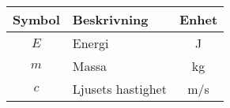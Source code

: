 \begin{raggedleft}
 \begin{tabular}{ c  l  c }
 \textbf{Symbol} & \textbf{Beskrivning} & \textbf{Enhet} \\ [0.5ex]
 \hline
 $E$ & Energi & \si{J} \\
 \hline
   $m$ & Massa & \si{kg} \\
 \hline
  $c$ & Ljusets hastighet & \si{m/s} \\
 \hline
\end{tabular}
\end{raggedleft}